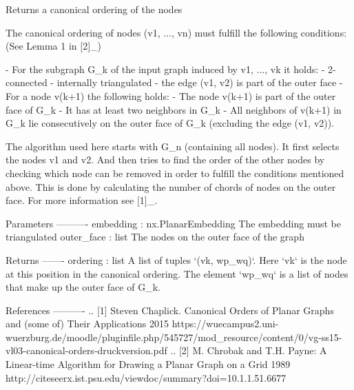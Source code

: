 \begin{DoxyVerb}Returns a canonical ordering of the nodes

The canonical ordering of nodes (v1, ..., vn) must fulfill the following
conditions:
(See Lemma 1 in [2]_)

- For the subgraph G_k of the input graph induced by v1, ..., vk it holds:
    - 2-connected
    - internally triangulated
    - the edge (v1, v2) is part of the outer face
- For a node v(k+1) the following holds:
    - The node v(k+1) is part of the outer face of G_k
    - It has at least two neighbors in G_k
    - All neighbors of v(k+1) in G_k lie consecutively on the outer face of
      G_k (excluding the edge (v1, v2)).

The algorithm used here starts with G_n (containing all nodes). It first
selects the nodes v1 and v2. And then tries to find the order of the other
nodes by checking which node can be removed in order to fulfill the
conditions mentioned above. This is done by calculating the number of
chords of nodes on the outer face. For more information see [1]_.

Parameters
----------
embedding : nx.PlanarEmbedding
    The embedding must be triangulated
outer_face : list
    The nodes on the outer face of the graph

Returns
-------
ordering : list
    A list of tuples `(vk, wp_wq)`. Here `vk` is the node at this position
    in the canonical ordering. The element `wp_wq` is a list of nodes that
    make up the outer face of G_k.

References
----------
.. [1] Steven Chaplick.
    Canonical Orders of Planar Graphs and (some of) Their Applications 2015
    https://wuecampus2.uni-wuerzburg.de/moodle/pluginfile.php/545727/mod_resource/content/0/vg-ss15-vl03-canonical-orders-druckversion.pdf
.. [2] M. Chrobak and T.H. Payne:
    A Linear-time Algorithm for Drawing a Planar Graph on a Grid 1989
    http://citeseerx.ist.psu.edu/viewdoc/summary?doi=10.1.1.51.6677\end{DoxyVerb}
 \mbox{\label{namespacenetworkx_1_1algorithms_1_1planar__drawing_a2bf4bd4ab4a56044a6fa886186b84487}} 
